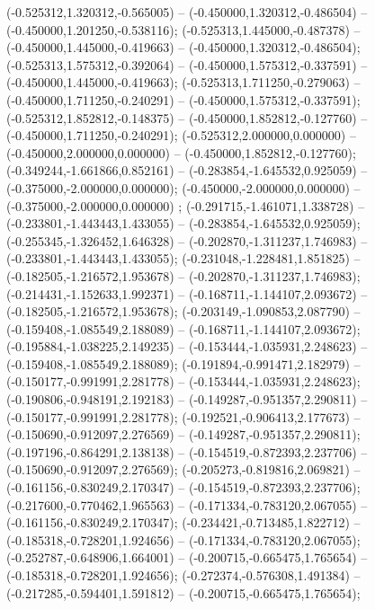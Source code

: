  (-0.525312,1.320312,-0.565005) -- (-0.450000,1.320312,-0.486504) -- (-0.450000,1.201250,-0.538116);
 (-0.525313,1.445000,-0.487378) -- (-0.450000,1.445000,-0.419663) -- (-0.450000,1.320312,-0.486504);
 (-0.525313,1.575312,-0.392064) -- (-0.450000,1.575312,-0.337591) -- (-0.450000,1.445000,-0.419663);
 (-0.525313,1.711250,-0.279063) -- (-0.450000,1.711250,-0.240291) -- (-0.450000,1.575312,-0.337591);
 (-0.525312,1.852812,-0.148375) -- (-0.450000,1.852812,-0.127760) -- (-0.450000,1.711250,-0.240291);
 (-0.525312,2.000000,0.000000) -- (-0.450000,2.000000,0.000000) -- (-0.450000,1.852812,-0.127760);
 (-0.349244,-1.661866,0.852161) -- (-0.283854,-1.645532,0.925059) -- (-0.375000,-2.000000,0.000000);
 (-0.450000,-2.000000,0.000000) -- (-0.375000,-2.000000,0.000000) ;
 (-0.291715,-1.461071,1.338728) -- (-0.233801,-1.443443,1.433055) -- (-0.283854,-1.645532,0.925059);
 (-0.255345,-1.326452,1.646328) -- (-0.202870,-1.311237,1.746983) -- (-0.233801,-1.443443,1.433055);
 (-0.231048,-1.228481,1.851825) -- (-0.182505,-1.216572,1.953678) -- (-0.202870,-1.311237,1.746983);
 (-0.214431,-1.152633,1.992371) -- (-0.168711,-1.144107,2.093672) -- (-0.182505,-1.216572,1.953678);
 (-0.203149,-1.090853,2.087790) -- (-0.159408,-1.085549,2.188089) -- (-0.168711,-1.144107,2.093672);
 (-0.195884,-1.038225,2.149235) -- (-0.153444,-1.035931,2.248623) -- (-0.159408,-1.085549,2.188089);
 (-0.191894,-0.991471,2.182979) -- (-0.150177,-0.991991,2.281778) -- (-0.153444,-1.035931,2.248623);
 (-0.190806,-0.948191,2.192183) -- (-0.149287,-0.951357,2.290811) -- (-0.150177,-0.991991,2.281778);
 (-0.192521,-0.906413,2.177673) -- (-0.150690,-0.912097,2.276569) -- (-0.149287,-0.951357,2.290811);
 (-0.197196,-0.864291,2.138138) -- (-0.154519,-0.872393,2.237706) -- (-0.150690,-0.912097,2.276569);
 (-0.205273,-0.819816,2.069821) -- (-0.161156,-0.830249,2.170347) -- (-0.154519,-0.872393,2.237706);
 (-0.217600,-0.770462,1.965563) -- (-0.171334,-0.783120,2.067055) -- (-0.161156,-0.830249,2.170347);
 (-0.234421,-0.713485,1.822712) -- (-0.185318,-0.728201,1.924656) -- (-0.171334,-0.783120,2.067055);
 (-0.252787,-0.648906,1.664001) -- (-0.200715,-0.665475,1.765654) -- (-0.185318,-0.728201,1.924656);
 (-0.272374,-0.576308,1.491384) -- (-0.217285,-0.594401,1.591812) -- (-0.200715,-0.665475,1.765654);
